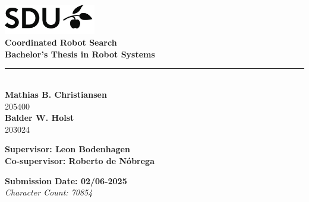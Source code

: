 \begin{titlepage}
    \includegraphics[width=0.3\textwidth]{figures/sdu_logo.png} \\[10mm]

    {\Huge \textbf{Coordinated Robot Search}} \\[0.5cm]
    {\Large \textbf{Bachelor's Thesis in Robot Systems}} \\[3mm]
    \noindent\rule{\textwidth}{1pt} \\[15mm]
    {\Large \textbf{Mathias B. Christiansen}} \\[-1mm]
    {\small 205400} \\
    {\Large \textbf{Balder W. Holst}} \\[-1mm]
    {\small 203024}

    \vfill


    {\large
        \textbf{Supervisor: Leon Bodenhagen} \\
        \textbf{Co-supervisor: Roberto de Nóbrega} \\[3mm]
    }

    {\large
        \textbf{Submission Date: 02/06-2025}
    } \\[2mm]

    \textit{Character Count: 70854} \\[-19mm]

\end{titlepage}
